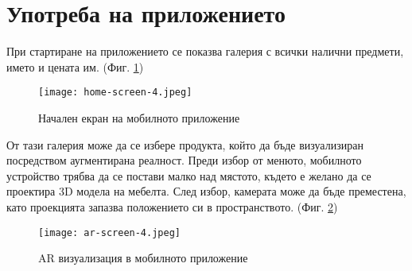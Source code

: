 \section{Употреба на приложението}
При стартиране на приложението се показва галерия с всички налични предмети, името и цената им. (Фиг. \ref{fig:home-screen-in-4})
\begin{figure}[H]
    \texttt{[image: home-screen-4.jpeg]}
    \centering
    \caption{Начален екран на мобилното приложение}
    \label{fig:home-screen-in-4}
\end{figure}

От тази галерия може да се избере продукта, който да бъде визуализиран посредством аугментирана реалност. Преди избор от менюто, мобилното устройство трябва да се постави малко над мястото, където е желано да се проектира 3D модела на мебелта. След избор, камерата може да бъде преместена, като проекцията запазва положението си в пространството. (Фиг. \ref{fig:ar-screen-in-4})
\begin{figure}[H]
    \texttt{[image: ar-screen-4.jpeg]}
    \centering
    \caption{AR визуализация в мобилното приложение}
    \label{fig:ar-screen-in-4}
\end{figure}